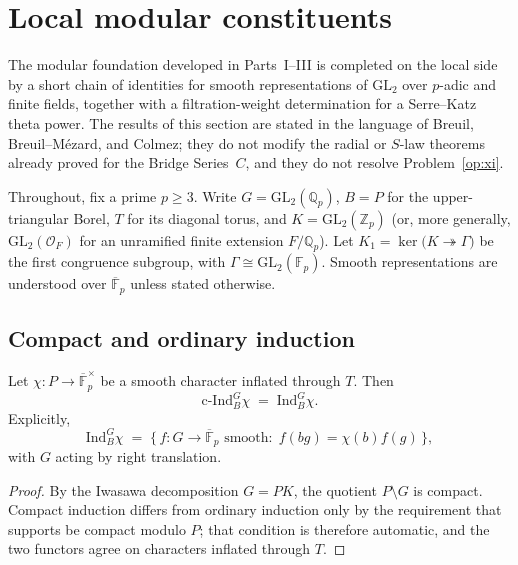 \section{Local modular constituents}\label{sec:modlocal}
The modular foundation developed in Parts~I--III is completed on the local side by a short chain of identities for smooth representations of $\mathrm{GL}_2$ over $p$-adic and finite fields, together with a filtration-weight determination for a Serre--Katz theta power. The results of this section are stated in the language of Breuil, Breuil--M\'ezard, and Colmez; they do not modify the radial or $S$-law theorems already proved for the Bridge Series~$C$, and they do not resolve Problem~\ref{op:xi}.

Throughout, fix a prime $p\ge3$. Write $G=\mathrm{GL}_2(\mathbb{Q}_p)$, $B=P$ for the upper-triangular Borel, $T$ for its diagonal torus, and $K=\mathrm{GL}_2(\mathbb{Z}_p)$ (or, more generally, $\mathrm{GL}_2(\mathcal{O}_F)$ for an unramified finite extension $F/\mathbb{Q}_p$). Let $K_1=\ker\bigl(K\twoheadrightarrow\Gamma\bigr)$ be the first congruence subgroup, with $\Gamma\cong\mathrm{GL}_2(\mathbb{F}_p)$. Smooth representations are understood over $\overline{\mathbb{F}}_p$ unless stated otherwise.

\subsection{Compact and ordinary induction}
\begin{theorem}\label{thm:cind-ind}
Let $\chi\colon P\to\overline{\mathbb{F}}_p^\times$ be a smooth character inflated through $T$. Then
\[
\mathrm{c\text{-}Ind}_B^G\chi \;=\; \mathrm{Ind}_B^G\chi.
\]
Explicitly,
\[
\mathrm{Ind}_B^G\chi \;=\; \bigl\{\,f\colon G\to\overline{\mathbb{F}}_p\text{ smooth}:\; f(bg)=\chi(b)f(g)\,\bigr\},
\]
with $G$ acting by right translation.
\end{theorem}
\begin{proof}
By the Iwasawa decomposition $G=PK$, the quotient $P\setminus G$ is compact. Compact induction differs from ordinary induction only by the requirement that supports be compact modulo $P$; that condition is therefore automatic, and the two functors agree on characters inflated through $T$.
\end{proof}


